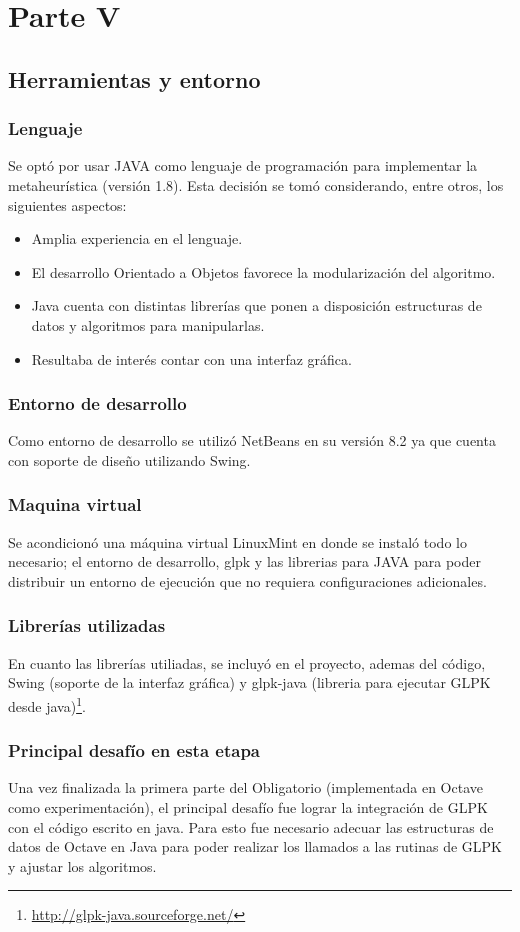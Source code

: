 \documentclass{extarticle}
\begin{document}
\section{Parte V}
\subsection{Herramientas y entorno}
\subsubsection{Lenguaje}
Se optó por usar JAVA como lenguaje de programación para implementar la metaheurística (versión 1.8). Esta decisión se tomó considerando, entre otros, los siguientes aspectos:
\begin{itemize}
	\item Amplia experiencia en el lenguaje.
	\item El desarrollo Orientado a Objetos favorece la modularización del algoritmo.
	\item Java cuenta con distintas librerías que ponen a disposición estructuras de datos y algoritmos para manipularlas.
	\item Resultaba de interés contar con una interfaz gráfica.
\end{itemize}
\subsubsection{Entorno de desarrollo}
Como entorno de desarrollo se utilizó NetBeans en su versión 8.2 ya que cuenta con soporte de diseño utilizando Swing.
\subsubsection{Maquina virtual}
Se acondicionó una máquina virtual LinuxMint en donde se instaló todo lo necesario; el entorno de desarrollo, glpk y las librerias para JAVA para poder distribuir un entorno de ejecución que no requiera configuraciones adicionales.
\subsubsection{Librerías utilizadas}
En cuanto las librerías utiliadas, se incluyó en el proyecto, ademas del código, Swing (soporte de la interfaz gráfica) y glpk-java (libreria para ejecutar GLPK desde java)\footnote{\url{http://glpk-java.sourceforge.net/}}.
\subsubsection{Principal desafío en esta etapa}
Una vez finalizada la primera parte del Obligatorio (implementada en Octave como experimentación), el principal desafío fue lograr la integración de GLPK con el código escrito en java. Para esto fue necesario adecuar las estructuras de datos de Octave en Java para poder realizar los llamados a las rutinas de GLPK y ajustar los algoritmos.
\end{document}
